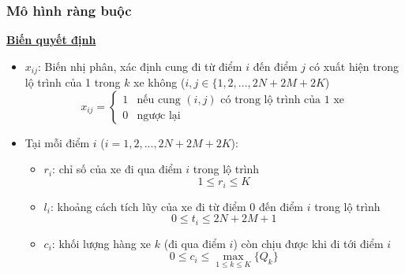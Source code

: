 \documentclass{beamer}
\begin{document}
	\begin{frame}
		\frametitle{Mô hình ràng buộc}
		\textbf{\underline{Biến quyết định}}
		\begin{itemize}
			\item $x_{ij}$: Biến nhị phân, xác định cung đi từ điểm $i$ đến điểm $j$ có xuất hiện trong lộ trình của 1 trong $k$ xe không ($i,j\in \{1,2,...,2N+2M+2K$)
			\begin{equation}
				x_{ij} = 
				\begin{cases}
					1 & \text{nếu cung $(i,j)$ có trong lộ trình của 1 xe}\\
					0 & \text{ngược lại}
				\end{cases}
			\end{equation}
			\item Tại mỗi điểm $i$ ($i=1,2,...,2N+2M+2K$):
			\begin{itemize}
				\item $r_i$: chỉ số của xe đi qua điểm $i$ trong lộ trình
				\begin{equation}
					1\leq r_i\leq K
				\end{equation}
				\item $l_i$: khoảng cách tích lũy của xe đi từ điểm $0$ đến điểm $i$ trong lộ trình
				\begin{equation}
					0\leq t_i\leq 2N+2M+1
				\end{equation}
				\item $c_i$: khối lượng hàng xe $k$ (đi qua điểm $i$) còn chịu được khi đi tới điểm $i$
				\begin{equation}
					0\leq c_i\leq \max _{1\leq k\leq K} \{Q_k\}
				\end{equation}
			\end{itemize}
		\end{itemize}
	\end{frame}
\end{document}
